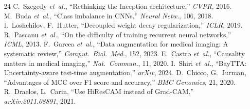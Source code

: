 \documentclass[11pt,a4paper]{article}
\begin{document}
\begin{thebibliography}{24}
 C.~Szegedy \emph{et~al.}, ``Rethinking the Inception architecture,'' \emph{CVPR}, 2016.
 M.~Buda \emph{et~al.}, ``Class imbalance in CNNs,'' \emph{Neural Netw.}, 106, 2018.
 I.~Loshchilov, F.~Hutter, ``Decoupled weight decay regularization,'' \emph{ICLR}, 2019.
 R.~Pascanu \emph{et~al.}, ``On the difficulty of training recurrent neural networks,'' \emph{ICML}, 2013.
 F.~Garcea \emph{et~al.}, ``Data augmentation for medical imaging: A systematic review,'' \emph{Comput.\ Biol.\ Med.}, 152, 2023.
 E.~Castro \emph{et~al.}, ``Causality matters in medical imaging,'' \emph{Nat.\ Commun.}, 11, 2020.
 I.~Shiri \emph{et~al.}, ``BayTTA: Uncertainty-aware test-time augmentation,'' \emph{arXiv}, 2024.
 D.~Chicco, G.~Jurman, ``Advantages of MCC over F1 score and accuracy,'' \emph{BMC Genomics}, 21, 2020.
 R.~Draelos, L.~Carin, ``Use HiResCAM instead of Grad-CAM,'' \emph{arXiv:2011.08891}, 2021.
\end{thebibliography}
\endgroup
\end{document}
